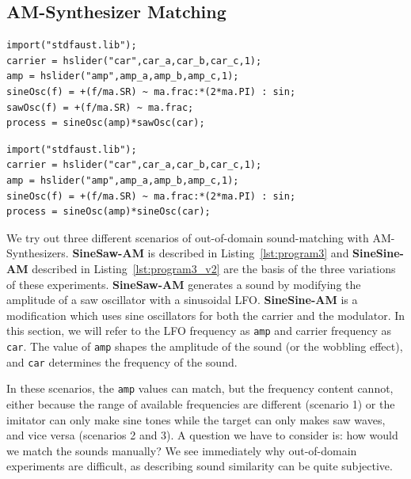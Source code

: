 \documentclass{article} %
\newcommand{\FMMod}{\textbf{SineSaw-AM}\xspace}
\newcommand{\FMModvtwo}{\textbf{SineSine-AM}\xspace}
\begin{document}
\subsection{AM-Synthesizer Matching}
\begin{lstlisting}[caption={\FMMod}, label={lst:program3},language=Faust,float,floatplacement=!H,xleftmargin=1em,xrightmargin=0.5em,firstnumber=0,aboveskip=0em, belowskip=-1em]
import("stdfaust.lib");
carrier = hslider("car",car_a,car_b,car_c,1);
amp = hslider("amp",amp_a,amp_b,amp_c,1);
sineOsc(f) = +(f/ma.SR) ~ ma.frac:*(2*ma.PI) : sin;
sawOsc(f) = +(f/ma.SR) ~ ma.frac;
process = sineOsc(amp)*sawOsc(car);
\end{lstlisting}


\begin{lstlisting}[caption={\FMModvtwo}, label={lst:program3_v2},language=Faust,float,floatplacement=!H,xleftmargin=1em,xrightmargin=0.5em,firstnumber=0,aboveskip=0em, belowskip=-1em]
import("stdfaust.lib");
carrier = hslider("car",car_a,car_b,car_c,1);
amp = hslider("amp",amp_a,amp_b,amp_c,1);
sineOsc(f) = +(f/ma.SR) ~ ma.frac:*(2*ma.PI) : sin;
process = sineOsc(amp)*sineOsc(car);
\end{lstlisting}


\label{sec:am_sound_matching}
We try out three different scenarios of out-of-domain sound-matching with AM-Synthesizers. \FMMod is described in Listing~\ref{lst:program3} and \FMModvtwo described in Listing~\ref{lst:program3_v2} are the basis of the three variations of these experiments. \FMMod generates a sound by modifying the amplitude of a saw oscillator with a sinusoidal LFO. \FMModvtwo is a modification which uses sine oscillators for both the carrier and the modulator. In this section, we will refer to the LFO frequency as \texttt{amp} and carrier frequency as \texttt{car}. The value of \texttt{amp} shapes the amplitude of the sound (or the wobbling effect), and \texttt{car} determines the frequency of the sound.

In these scenarios, the \texttt{amp} values can match, but the frequency content cannot, either because the range of available frequencies are different (scenario 1) or the imitator can only make sine tones while the target can only makes saw waves, and vice versa (scenarios 2 and 3). A question we have to consider is: how would we match the sounds manually? We see immediately why out-of-domain experiments are difficult, as describing sound similarity can be quite subjective.
\end{document}

